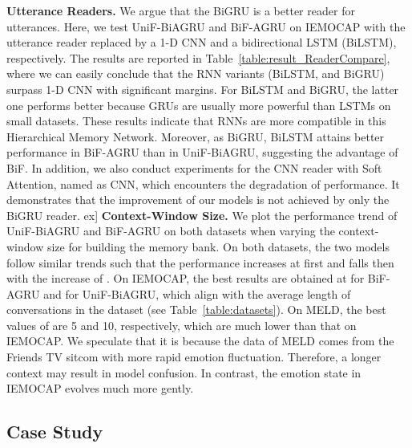 \documentclass[letterpaper]{article} \usepackage{aaai20}  \usepackage{times}  \usepackage{helvet} \usepackage{courier}  \usepackage[hyphens]{url}  \usepackage{graphicx} \urlstyle{rm} \def\UrlFont{\rm}  \usepackage{graphicx}  \frenchspacing  \setlength{\pdfpagewidth}{8.5in}  \setlength{\pdfpageheight}{11in}
\begin{document}
\noindent\textbf{Utterance Readers.}
We argue that the BiGRU is a better reader for utterances. Here, we test UniF-BiAGRU and BiF-AGRU on IEMOCAP with the utterance reader replaced by a 1-D CNN and a bidirectional LSTM (BiLSTM), respectively. The results are reported in Table~\ref{table:result_ReaderCompare}, where we can easily conclude that the RNN variants (BiLSTM, and BiGRU) surpass 1-D CNN with significant margins. For BiLSTM and BiGRU, the latter one performs better because GRUs are usually more powerful than LSTMs on small datasets. These results indicate that RNNs are more compatible in this Hierarchical Memory Network. Moreover, as BiGRU, BiLSTM attains better performance in BiF-AGRU than in UniF-BiAGRU, suggesting the advantage of BiF. In addition, we also conduct experiments for the CNN reader with Soft Attention, named as CNN, which encounters the degradation of performance. It demonstrates that the improvement of our models is not achieved by only the BiGRU reader. 
\1ex]
\noindent\textbf{Context-Window Size.}
We plot the performance trend of UniF-BiAGRU and BiF-AGRU on both datasets when varying the context-window size  for building the memory bank. On both datasets, the two models follow similar trends such that the performance increases at first and falls then with the increase of . On IEMOCAP, the best results are obtained at  for BiF-AGRU and  for UniF-BiAGRU, which align with the average length of conversations in the dataset (see Table~\ref{table:datasets}). On MELD, the best values of  are 5 and 10, respectively, which are much lower than that on IEMOCAP. We speculate that it is because the data of MELD comes from the Friends TV sitcom with more rapid emotion fluctuation. Therefore, a longer context may result in model confusion. In contrast, the emotion state in IEMOCAP evolves much more gently.


\subsection{Case Study}
\label{ssec:case_study}
\end{document}
